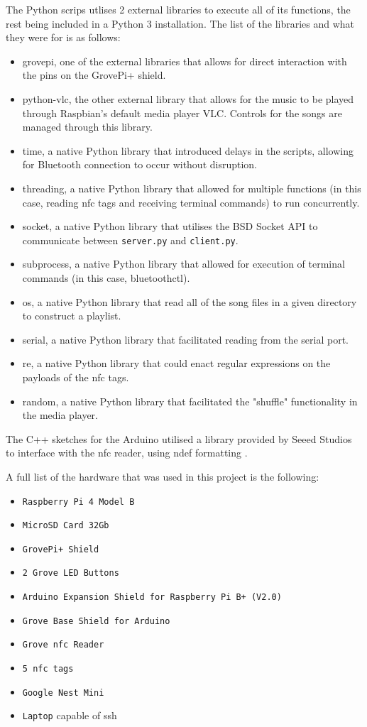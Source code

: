 The Python scrips utlises 2 external libraries to execute all of its functions, the rest being included in a Python 3 installation. The list of the libraries and what they were for is as follows:
\begin{itemize}
    \item grovepi, one of the external libraries that allows for direct interaction with the pins on the GrovePi+ shield.
    \item python-vlc, the other external library that allows for the music to be played through Raspbian's default media player VLC. Controls for the songs are managed through this library.
    \item time, a native Python library that introduced delays in the scripts, allowing for Bluetooth connection to occur without disruption.
    \item threading, a native Python library that allowed for multiple functions (in this case, reading \gls{nfc} tags and receiving terminal commands) to run concurrently.
    \item socket, a native Python library that utilises the BSD Socket API to communicate between \texttt{server.py} and \texttt{client.py}.
    \item subprocess, a native Python library that allowed for execution of terminal commands (in this case, bluetoothctl).
    \item os, a native Python library that read all of the song files in a given directory to construct a playlist.
    \item serial, a native Python library that facilitated reading from the serial port. 
    \item re, a native Python library that could enact regular expressions on the payloads of the \gls{nfc} tags.
    \item random, a native Python library that facilitated the "shuffle" functionality in the media player.
\end{itemize}

The C++ sketches for the Arduino utilised a library provided by Seeed Studios to interface with the \gls{nfc} reader, using \gls{ndef} formatting \citep{SeeedStudios2020}.

A full list of the hardware that was used in this project is the following:
\begin{itemize}
    \item \texttt{Raspberry Pi 4 Model B}
    \item \texttt{MicroSD Card 32Gb}
    \item \texttt{GrovePi+ Shield}
    \item \texttt{2 Grove LED Buttons}
    \item \texttt{Arduino Expansion Shield for Raspberry Pi B+ (V2.0)}
    \item \texttt{Grove Base Shield for Arduino}
    \item \texttt{Grove \gls{nfc} Reader}
    \item \texttt{5 \gls{nfc} tags}
    \item \texttt{Google Nest Mini}
    \item \texttt{Laptop} capable of \gls{ssh}
\end{itemize}


